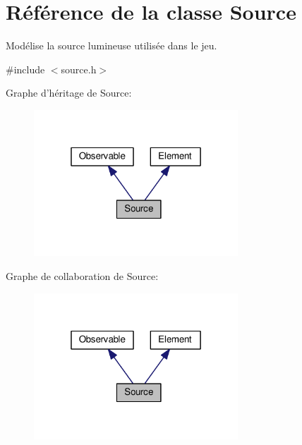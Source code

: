\hypertarget{classSource}{\section{Référence de la classe Source}
\label{classSource}
}


Modélise la source lumineuse utilisée dans le jeu.  




{\ttfamily \#include $<$source.\+h$>$}



Graphe d'héritage de Source\+:\nopagebreak
\begin{figure}[H]
\begin{center}
\leavevmode
\includegraphics[width=217pt]{da/d95/classSource__inherit__graph}
\end{center}
\end{figure}


Graphe de collaboration de Source\+:\nopagebreak
\begin{figure}[H]
\begin{center}
\leavevmode
\includegraphics[width=217pt]{d1/d35/classSource__coll__graph}
\end{center}
\end{figure}
